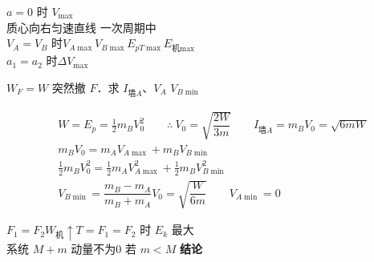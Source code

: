 $a=0$ 时 $V_{\max}$\\
质心向右匀速直线
一次周期中\\
$V_A=V_B$ 时\quad $V_{A\max}$\quad $V_{B\max}$\quad $E_{pT\max}$\quad $E_{\text{机}\max}$\\
$a_1=a_2$ 时\quad $\Delta V_{\max}$
\begin{problem}
$W_F=W$ 突然撤 $F$．求 $I_{\text{墙}A}$、$V_A$ $V_{B\min}$
\begin{solution}
\begin{align*}
&W=E_p=\tfrac12 m_BV_0^2\qquad\therefore\ V_0=\sqrt{\dfrac{2W}{3m}}\qquad I_{\text{墙}A}=m_BV_0=\sqrt{6mW}\\
&m_BV_0=m_AV_{A\max}+m_BV_{B\min}\\
&\tfrac12 m_BV_0^2=\tfrac12 m_AV_{A\max}^2+\tfrac12 m_BV_{B\min}^2\\
&V_{B\min}=\dfrac{m_B-m_A}{m_B+m_A}V_0=\sqrt{\dfrac{W}{6m}}\qquad V_{A\min}=0
\end{align*}
\end{solution}
\end{problem}
$F_1=F_2$\quad $W_{\text{机}}\uparrow$\quad $T=F_1=F_2$ 时 $E_k$ 最大\\
系统 $M+m$ 动量不为0
若 $m<M$
\textbf{结论}

